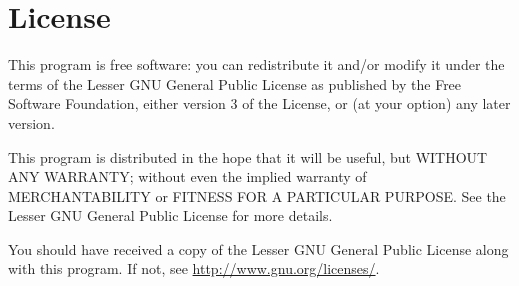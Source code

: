 \section{License}
This program is free software: you can redistribute it and/or modify
it under the terms of the Lesser GNU General Public License as published by
the Free Software Foundation, either version 3 of the License, or
(at your option) any later version.

This program is distributed in the hope that it will be useful,
but WITHOUT ANY WARRANTY; without even the implied warranty of
MERCHANTABILITY or FITNESS FOR A PARTICULAR PURPOSE.  See the
Lesser GNU General Public License for more details.
    
You should have received a copy of the Lesser GNU General Public License
along with this program.  If not, see \url{http://www.gnu.org/licenses/}.
